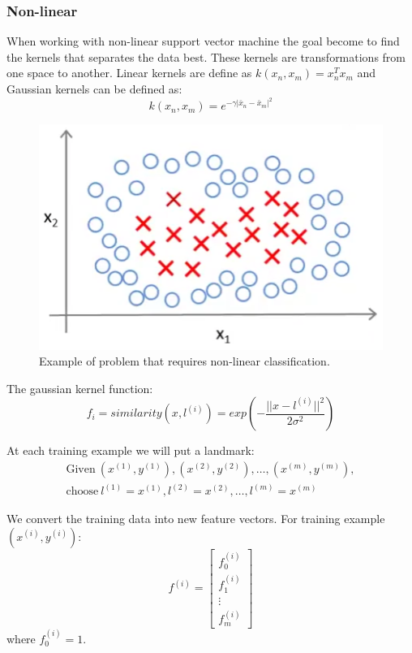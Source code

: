 \subsubsection{Non-linear}
When working with non-linear support vector machine the goal become to find the kernels that separates the data best. These kernels are transformations from one space to another. Linear kernels are define as $k(x_n,x_m)= x_n^Tx_m$ and Gaussian kernels can be defined as:
\begin{equation}
k(x_n,x_m) = e^{-\gamma|\bar{x}_n - \bar{x}_m|^2}
\end{equation}
\begin{figure}[H]
\centering
\includegraphics[scale=.75]{billeder/svm-non-linear}
\caption{Example of problem that requires non-linear classification.}
\label{fig:svm-non-linear}
\end{figure}

The gaussian kernel function:
\begin{equation}
f_i = similarity(x,l^{(i)}) =
exp\left(-\frac{||x-l^{(i)}||^2}{2\sigma^2}\right)
\end{equation}

At each training example we will put a landmark:
\begin{equation}
\begin{split}
\text{Given}\ (x^{(1)},y^{(1)}),(x^{(2)},y^{(2)}),\dots,(x^{(m)},y^{(m)}),\\
\text{choose}\ l^{(1)} = x^{(1)},l^{(2)} = x^{(2)},\dots,l^{(m)} = x^{(m)}
\end{split}
\end{equation}

We convert the training data into new feature vectors. For training example $(x^{(i)},y^{(i)})$:
\begin{equation}
f^{(i)}=
\begin{bmatrix}
f_0^{(i)} \\
f_1^{(i)} \\
\vdots \\
f_m^{(i)}
\end{bmatrix}
\end{equation}
 where $f_0^{(i)} = 1$.

